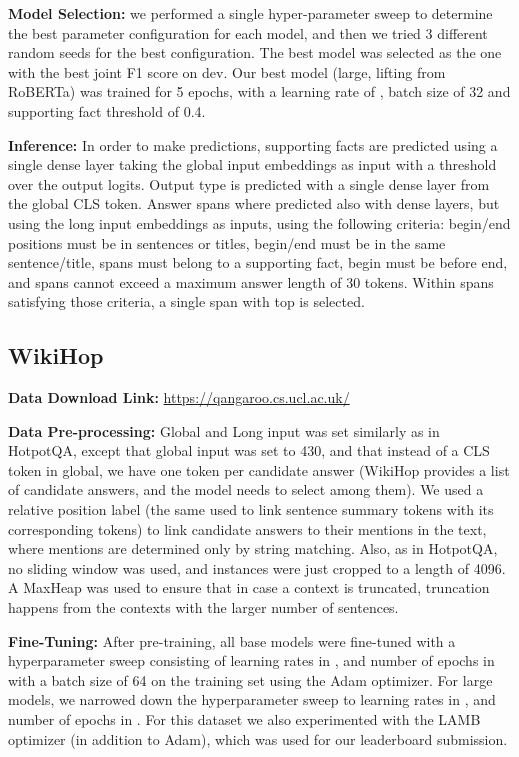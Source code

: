 \documentclass[11pt,a4paper]{article}
\begin{document}
{\bf Model Selection:} we performed a single hyper-parameter sweep to determine the best parameter configuration for each model, and then we tried 3 different random seeds for the best configuration. The best model was selected as the one with the best joint F1 score on dev. Our best model (large, lifting from RoBERTa) was trained for 5 epochs, with a learning rate of , batch size of 32 and supporting fact threshold of 0.4.

{\bf Inference:} In order to make predictions, supporting facts are predicted using a single dense layer taking the global input embeddings as input with a threshold over the output logits. Output type is predicted with a single dense layer from the global CLS token. Answer spans where predicted also with dense layers, but using the long input embeddings as inputs, using the following criteria: begin/end positions must be in sentences or titles, begin/end must be in the same sentence/title, spans must belong to a supporting fact, begin must be before end, and spans cannot exceed a maximum answer length of 30 tokens. Within spans satisfying those criteria, a single span with top  is selected.


\subsection*{WikiHop}

{\bf Data Download Link:} \url{https://qangaroo.cs.ucl.ac.uk/}

{\bf Data Pre-processing:} Global and Long input was set similarly as in HotpotQA, except that global input was set to 430, and that instead of a CLS token in global, we have one token per candidate answer (WikiHop provides a list of candidate answers, and the model needs to select among them). We used a relative position label (the same used to link sentence summary tokens with its corresponding tokens) to link candidate answers to their mentions in the text, where mentions are determined only by string matching. Also, as in HotpotQA, no sliding window was used, and instances were just cropped to a length of 4096. A MaxHeap was used to ensure that in case a context is truncated, truncation happens from the contexts with the larger number of sentences. 

{\bf Fine-Tuning:} After pre-training, all base models were fine-tuned with a hyperparameter sweep consisting of learning rates in , and number of epochs in  with a batch size of 64 on the training set using the Adam optimizer. For large models, we narrowed down the hyperparameter sweep to learning rates in , and number of epochs in . For this dataset we also experimented with the LAMB optimizer (in addition to Adam), which was used for our leaderboard submission. 
\end{document}
